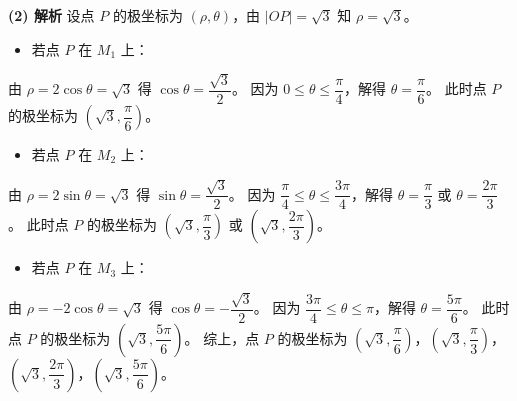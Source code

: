 \begin{answer}
\textbf{(2) 解析}
设点 $P$ 的极坐标为 $(\rho, \theta)$，由 $|OP| = \sqrt{3}$ 知 $\rho = \sqrt{3}$。
\begin{itemize}
\item 若点 $P$ 在 $M_1$ 上：
\end{itemize}
  由 $\rho = 2\cos\theta = \sqrt{3}$ 得 $\cos\theta = \dfrac{\sqrt{3}}{2}$。
  因为 $0 \leqslant \theta \leqslant \dfrac{\pi}{4}$，解得 $\theta = \dfrac{\pi}{6}$。
  此时点 $P$ 的极坐标为 $\left(\sqrt{3}, \dfrac{\pi}{6}\right)$。
\begin{itemize}
\item 若点 $P$ 在 $M_2$ 上：
\end{itemize}
  由 $\rho = 2\sin\theta = \sqrt{3}$ 得 $\sin\theta = \dfrac{\sqrt{3}}{2}$。
  因为 $\dfrac{\pi}{4} \leqslant \theta \leqslant \dfrac{3\pi}{4}$，解得 $\theta = \dfrac{\pi}{3}$ 或 $\theta = \dfrac{2\pi}{3}$。
  此时点 $P$ 的极坐标为 $\left(\sqrt{3}, \dfrac{\pi}{3}\right)$ 或 $\left(\sqrt{3}, \dfrac{2\pi}{3}\right)$。
\begin{itemize}
\item 若点 $P$ 在 $M_3$ 上：
\end{itemize}
  由 $\rho = -2\cos\theta = \sqrt{3}$ 得 $\cos\theta = -\dfrac{\sqrt{3}}{2}$。
  因为 $\dfrac{3\pi}{4} \leqslant \theta \leqslant \pi$，解得 $\theta = \dfrac{5\pi}{6}$。
  此时点 $P$ 的极坐标为 $\left(\sqrt{3}, \dfrac{5\pi}{6}\right)$。
综上，点 $P$ 的极坐标为 $\left(\sqrt{3}, \dfrac{\pi}{6}\right)$，$\left(\sqrt{3}, \dfrac{\pi}{3}\right)$，$\left(\sqrt{3}, \dfrac{2\pi}{3}\right)$，$\left(\sqrt{3}, \dfrac{5\pi}{6}\right)$。



\end{answer}
